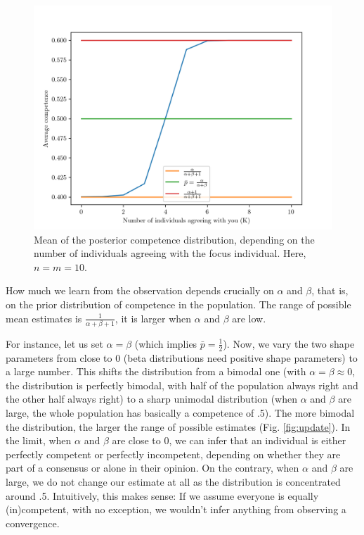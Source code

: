\documentclass[
  doc,floatsintext]{apa6}
\begin{document}
\begin{figure}

\includegraphics[width=0.75\linewidth]{figures/Benoit_competence_k} \hfill{}

\caption{Mean of the posterior competence distribution, depending on the number of individuals agreeing with the focus individual. Here, \(n=m=10\).}\label{fig:competence-k}
\end{figure}

How much we learn from the observation depends crucially on \(\alpha\) and \(\beta\), that is, on the prior distribution of competence in the population. The range of possible mean estimates is \(\frac{1}{\alpha+\beta + 1}\), it is larger when \(\alpha\) and \(\beta\) are low.

For instance, let us set \(\alpha=\beta\) (which implies \(\bar p = \frac 12\)). Now, we vary the two shape parameters from close to 0 (beta distributions need positive shape parameters) to a large number. This shifts the distribution from a bimodal one (with \(\alpha=\beta \approx 0\), the distribution is perfectly bimodal, with half of the population always right and the other half always right) to a sharp unimodal distribution (when \(\alpha\) and \(\beta\) are large, the whole population has basically a competence of .5). The more bimodal the distribution, the larger the range of possible estimates (Fig. \ref{fig:update}). In the limit, when \(\alpha\) and \(\beta\) are close to 0, we can infer that an individual is either perfectly competent or perfectly incompetent, depending on whether they are part of a consensus or alone in their opinion. On the contrary, when \(\alpha\) and \(\beta\) are large, we do not change our estimate at all as the distribution is concentrated around .5. Intuitively, this makes sense: If we assume everyone is equally (in)competent, with no exception, we wouldn't infer anything from observing a convergence.
\end{document}
